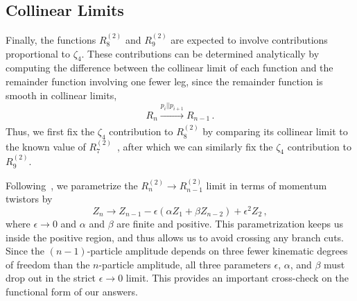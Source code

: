 \documentclass[11pt]{article}
\begin{document}
\subsection{Collinear Limits}
\label{sec:collinear_limits}

Finally, the functions $R_8^{(2)}$ and $R_9^{(2)}$ are expected to involve contributions proportional to $\zeta_4$. These contributions can be determined analytically by computing the difference between the collinear limit of each function and the remainder function involving one fewer leg, since the remainder function is smooth in collinear limits, 
\begin{equation}
R_n \xrightarrow[]{p_i || p_{i+1}} R_{n-1} \, .
\end{equation} 
Thus, we first fix the $\zeta_4$ contribution to $R_8^{(2)}$\! by comparing its collinear limit to the known value of $R_7^{(2)}$\!~\cite{Golden:2014xqf}, after which we can similarly fix the $\zeta_4$ contribution to $R_9^{(2)}$\!. 


Following~\cite{CaronHuot:2011ky}, we parametrize the $R_n^{(2)} \to R_{n-1}^{(2)}$ limit in terms of momentum twistors by
\begin{equation} \label{eq:collinear_parametrization}
Z_n \to Z_{n-1} - \epsilon (\alpha Z_1 + \beta Z_{n-2}) + \epsilon^2 Z_2 \, ,
\end{equation}
where $\epsilon \to 0$ and $\alpha$ and $\beta$ are finite and positive. This parametrization keeps us inside the positive region, and thus allows us to avoid crossing any branch cuts. Since the $(n{-}1)$-particle amplitude depends on three fewer kinematic degrees of freedom than the $n$-particle amplitude, all three parameters $\epsilon$, $\alpha$, and $\beta$ must drop out in the strict $\epsilon \to 0$ limit. This provides an important cross-check on the functional form of our answers.
\end{document}
